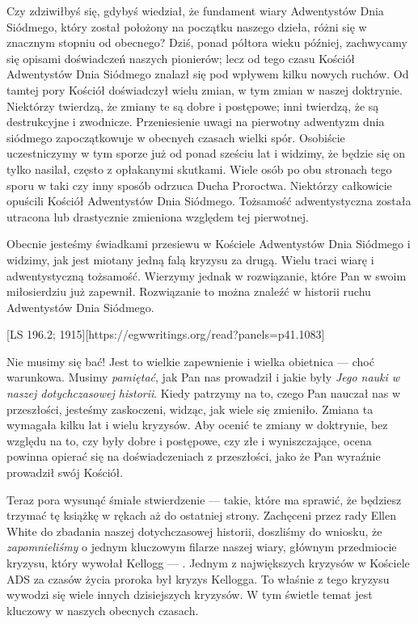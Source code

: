 Czy zdziwiłbyś się, gdybyś wiedział, że fundament wiary Adwentystów Dnia Siódmego, który został położony na początku naszego dzieła, różni się w znacznym stopniu od obecnego? Dziś, ponad półtora wieku później, zachwycamy się opisami doświadczeń naszych pionierów; lecz od tego czasu Kościół Adwentystów Dnia Siódmego znalazł się pod wpływem kilku nowych ruchów. Od tamtej pory Kościół doświadczył wielu zmian, w tym zmian w naszej doktrynie. Niektórzy twierdzą, że zmiany te są dobre i postępowe; inni twierdzą, że są destrukcyjne i zwodnicze. Przeniesienie uwagi na pierwotny adwentyzm dnia siódmego zapoczątkowuje w obecnych czasach wielki spór. Osobiście uczestniczymy w tym sporze już od ponad sześciu lat i widzimy, że będzie się on tylko nasilał, często z opłakanymi skutkami. Wiele osób po obu stronach tego sporu w taki czy inny sposób odrzuca Ducha Proroctwa. Niektórzy całkowicie opuścili Kościół Adwentystów Dnia Siódmego. Tożsamość adwentystyczna została utracona lub drastycznie zmieniona względem tej pierwotnej.

Obecnie jesteśmy świadkami przesiewu w Kościele Adwentystów Dnia Siódmego i widzimy, jak jest miotany jedną falą kryzysu za drugą. Wielu traci wiarę i adwentystyczną tożsamość. Wierzymy jednak w rozwiązanie, które Pan w swoim miłosierdziu już zapewnił. Rozwiązanie to można znaleźć w historii ruchu Adwentystów Dnia Siódmego.

[LS 196.2; 1915][https://egwwritings.org/read?panels=p41.1083]

Nie musimy się bać! Jest to wielkie zapewnienie i wielka obietnica — choć warunkowa. Musimy \textit{pamiętać}, jak Pan nas prowadził i jakie były \textit{Jego nauki w naszej dotychczasowej historii}. Kiedy patrzymy na to, czego Pan nauczał nas w przeszłości, jesteśmy zaskoczeni, widząc, jak wiele się zmieniło. Zmiana ta wymagała kilku lat i wielu kryzysów. Aby ocenić te zmiany w doktrynie, bez względu na to, czy były dobre i postępowe, czy złe i wyniszczające, ocena powinna opierać się na doświadczeniach z przeszłości, jako że Pan wyraźnie prowadził swój Kościół.

Teraz pora wysunąć śmiałe stwierdzenie — takie, które ma sprawić, że będziesz trzymać tę książkę w rękach aż do ostatniej strony. Zachęceni przez rady Ellen White do zbadania naszej dotychczasowej historii, doszliśmy do wniosku, że \textit{zapomnieliśmy} o jednym kluczowym filarze naszej wiary, głównym przedmiocie kryzysu, który wywołał Kellogg — . Jednym z największych kryzysów w Kościele ADS za czasów życia proroka był kryzys Kellogga. To właśnie z tego kryzysu wywodzi się wiele innych dzisiejszych kryzysów. W tym świetle temat  jest kluczowy w naszych obecnych czasach.

